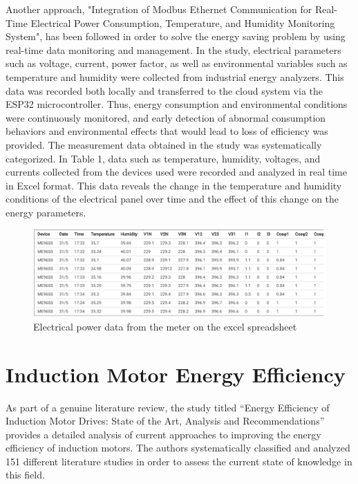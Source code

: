     Another approach, "Integration of Modbus Ethernet Communication for Real-Time Electrical Power Consumption, Temperature, and Humidity Monitoring System", has been followed in order to solve the energy saving problem by using real-time data monitoring and management. In the study, electrical parameters such as voltage, current, power factor, as well as environmental variables such as temperature and humidity were collected from industrial energy analyzers. This data was recorded both locally and transferred to the cloud system via the ESP32 microcontroller. Thus, energy consumption and environmental conditions were continuously monitored, and early detection of abnormal consumption behaviors and environmental effects that would lead to loss of efficiency was provided. The measurement data obtained in the study was systematically categorized. In Table 1, data such as temperature, humidity, voltages, and currents collected from the devices used were recorded and analyzed in real time in Excel format. This data reveals the change in the temperature and humidity conditions of the electrical panel over time and the effect of this change on the energy parameters.

    \begin{figure}[H]
        \centering
        \includegraphics[width=0.8\columnwidth]{imgs/Electrical power data from the meter on the excel spreadsheet.png}
        \caption[Short description for list of figures]{Electrical power data from the meter on the excel spreadsheet }
        \label{fig-magnitude}
        \end{figure}%

        
\section{Induction Motor Energy Efficiency}

As part of a genuine literature review, the study titled “Energy Efficiency of Induction Motor Drives: State of the Art, Analysis and Recommendations” provides a detailed analysis of current approaches to improving the energy efficiency of induction motors. The authors systematically classified and analyzed 151 different literature studies in order to assess the current state of knowledge in this field.

